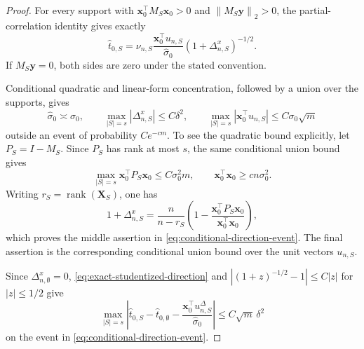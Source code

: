\documentclass[a4paper,11pt,english]{article}
\newcommand{\norm}[1]{\left\lVert #1\right\rVert}
\begin{document}
\begin{proof}
For every support with
$\mathbf x_0^\top M_S\mathbf x_0>0$ and
$\norm{M_S\mathbf y}_2>0$, the partial-correlation identity gives exactly
\begin{equation}\label{eq:exact-studentized-direction}
        \hat t_{0,S}
        =\nu_{n,S}\frac{\mathbf x_0^\top u_{n,S}}{\hat\sigma_0}
        (1+\Delta^x_{n,S})^{-1/2}.
\end{equation}
If $M_S\mathbf y=0$, both sides are zero under the stated convention.

Conditional quadratic and linear-form concentration, followed by a union
over the supports, gives
\begin{equation}\label{eq:conditional-direction-event}
        \hat\sigma_0\asymp\sigma_0,
        \qquad
        \max_{|S|=s}|\Delta^x_{n,S}|\le C\delta^2,
        \qquad
        \max_{|S|=s}|\mathbf x_0^\top u_{n,S}|
        \le C\sigma_0\sqrt m
\end{equation}
outside an event of probability $Ce^{-cm}$.  To see the quadratic bound
explicitly, let $P_S=I-M_S$.  Since $P_S$ has rank at most $s$, the same
conditional union bound gives
\[
 \max_{|S|=s}\mathbf x_0^\top P_S\mathbf x_0
 \le C\sigma_0^2m,
 \qquad
 \mathbf x_0^\top\mathbf x_0\ge cn\sigma_0^2.
\]
Writing $r_S=\operatorname{rank}(\mathbf X_S)$, one has
\[
 1+\Delta^x_{n,S}
 =\frac{n}{n-r_S}\left(1-
 \frac{\mathbf x_0^\top P_S\mathbf x_0}
 {\mathbf x_0^\top\mathbf x_0}\right),
\]
which proves the middle assertion in
\eqref{eq:conditional-direction-event}.  The final assertion is the
corresponding conditional union bound over the unit vectors $u_{n,S}$.

Since $\Delta^x_{n,\emptyset}=0$,
\eqref{eq:exact-studentized-direction} and
$|(1+z)^{-1/2}-1|\le C|z|$ for $|z|\le1/2$ give
\[
 \max_{|S|=s}\left|
 \hat t_{0,S}-\hat t_{0,\emptyset}
 -\frac{\mathbf x_0^\top u_{n,S}^{\Delta}}{\hat\sigma_0}
 \right|
 \le C\sqrt m\,\delta^2
\]
on the event in \eqref{eq:conditional-direction-event}.
\end{proof}
\end{document}
